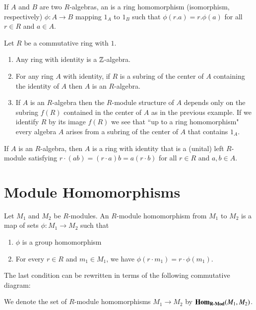 \documentclass[12pt, a4paper, oneside, openright, titlepage]{book}
\begin{document}
\begin{defn}
    If $A$ and $B$ are two $R$-algebras, an  is a ring homomorphism (isomorphism, respectively) $\phi:A\rightarrow B$ mapping $1_A$ to $1_B$ such that $\phi(r.a) = r.\phi(a)$ for all $r \in R$ and $a \in A$.
\end{defn}


\begin{eg}
    Let $R$ be a commutative ring with $1$. \begin{enumerate}
        \item Any ring with identity is a $\mathbb Z$-algebra.
        \item For any ring $A$ with identity, if $R$ is a subring of the center of $A$ containing the identity of $A$ then $A$ is an $R$-algebra. 
        \item If $A$ is an $R$-algebra then the $R$-module structure of $A$ depends only on the subring $f(R)$ contained in the center of $A$ as in the previous example. If we identify $R$ by its image $f(R)$ we see that ``up to a ring homomorphism" every algebra $A$ arises from a subring of the center of $A$ that contains $1_A$.
    \end{enumerate}
\end{eg}

If $A$ is an $R$-algebra, then $A$ is a ring with identity that is a (unital) left $R$-module satisfying $r\cdot (ab) = (r\cdot a)b = a(r\cdot b)$ for all $r \in R$ and $a,b \in A$.



\section{\textsection Module Homomorphisms}

\begin{defn}
    Let $M_1$ and $M_2$ be $R$-modules. An $R$-module homomorphism from $M_1$ to $M_2$ is a map of sets $\phi:M_1\rightarrow M_2$ such that \begin{enumerate}
        \item $\phi$ is a group homomorphism
        \item For every $r \in R$ and $m_1 \in M_1$, we have $\phi(r\cdot m_1) = r\cdot \phi(m_1)$.
    \end{enumerate}
    The last condition can be rewritten in terms of the following commutative diagram:
        \begin{center}
        \end{center}
    We denote the set of $R$-module homomorphisms $M_1\rightarrow M_2$ by $\mathbf{Hom}_{\normalfont\textbf{R-Mod}}(M_1,M_2)$.
\end{defn}
\end{document}
